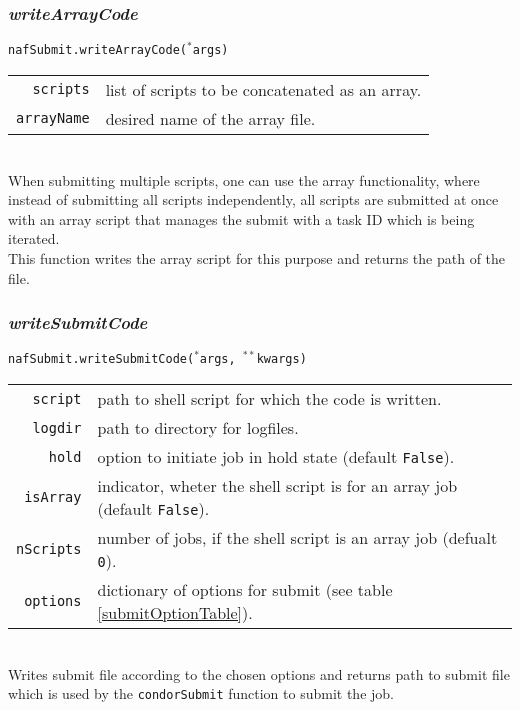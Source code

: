 \documentclass[12pt, a4paper]{article}
\newcommand{\args}{$^*$args}
\newcommand{\kwargs}{$^{**}$kwargs}
\begin{document}
\subsubsection{\textit{writeArrayCode}}
\texttt{nafSubmit.writeArrayCode(\args)}\\
\begin{tabular}{r|l}
\hline
\texttt{scripts}	&	list of scripts to be concatenated as an array.\\
\texttt{arrayName}	& 	desired name of the array file.\\
\hline
\end{tabular}
\\
When submitting multiple scripts, one can use the array functionality, where instead of submitting all scripts independently, all scripts are submitted at once with an array script that manages the submit with a task ID which is being iterated.\\
This function writes the array script for this purpose and returns the path of the file.


\subsubsection{\textit{writeSubmitCode}}
\label{writeSubmitCode}
\texttt{nafSubmit.writeSubmitCode(\args, \kwargs)}\\
\begin{tabular}{r|l}
\hline
\texttt{script}		&	path to shell script for which the code is written.\\
\texttt{logdir}		&	path to directory for logfiles.\\
\texttt{hold}		&	option to initiate job in hold state (default \texttt{False}).\\
\texttt{isArray}	&	indicator, wheter the shell script is for an array job (default \texttt{False}).\\
\texttt{nScripts}	&	number of jobs, if the shell script is an array job (defualt \texttt{0}).\\
\texttt{options}	&	dictionary of options for submit (see table \ref{submitOptionTable}).\\
\hline
\end{tabular}
\\
Writes submit file according to the chosen options and returns path to submit file which is used by the \texttt{condorSubmit} function to submit the job.
\end{document}

